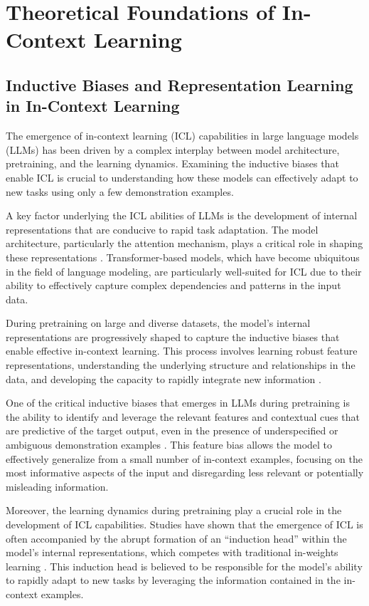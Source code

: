 \documentclass[11pt]{article}
\begin{document}
\section{Theoretical Foundations of In-Context Learning}

\subsection{Inductive Biases and Representation Learning in In-Context Learning}

The emergence of in-context learning (ICL) capabilities in large language models (LLMs) has been driven by a complex interplay between model architecture, pretraining, and the learning dynamics. Examining the inductive biases that enable ICL is crucial to understanding how these models can effectively adapt to new tasks using only a few demonstration examples.

A key factor underlying the ICL abilities of LLMs is the development of internal representations that are conducive to rapid task adaptation. The model architecture, particularly the attention mechanism, plays a critical role in shaping these representations \cite{ref35}. Transformer-based models, which have become ubiquitous in the field of language modeling, are particularly well-suited for ICL due to their ability to effectively capture complex dependencies and patterns in the input data.

During pretraining on large and diverse datasets, the model's internal representations are progressively shaped to capture the inductive biases that enable effective in-context learning. This process involves learning robust feature representations, understanding the underlying structure and relationships in the data, and developing the capacity to rapidly integrate new information \cite{ref36}.

One of the critical inductive biases that emerges in LLMs during pretraining is the ability to identify and leverage the relevant features and contextual cues that are predictive of the target output, even in the presence of underspecified or ambiguous demonstration examples \cite{ref37}. This feature bias allows the model to effectively generalize from a small number of in-context examples, focusing on the most informative aspects of the input and disregarding less relevant or potentially misleading information.

Moreover, the learning dynamics during pretraining play a crucial role in the development of ICL capabilities. Studies have shown that the emergence of ICL is often accompanied by the abrupt formation of an ``induction head'' within the model's internal representations, which competes with traditional in-weights learning \cite{ref38}. This induction head is believed to be responsible for the model's ability to rapidly adapt to new tasks by leveraging the information contained in the in-context examples.
\end{document}
